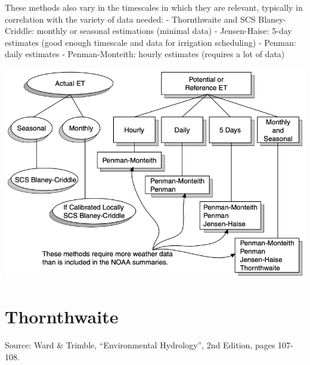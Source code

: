 \documentclass[
  letterpaper,
  DIV=11,
  numbers=noendperiod]{scrreprt}
\begin{document}
These methods also vary in the timescales in which they are relevant,
typically in correlation with the variety of data needed: - Thornthwaite
and SCS Blaney-Criddle: monthly or seasonal estimations (minimal data) -
Jensen-Haise: 5-day estimates (good enough timescale and data for
irrigation scheduling) - Penman: daily estimates - Penman-Monteith:
hourly estimates (requires a lot of data)

\includegraphics{archive/figures/trimble-figure4.13.png}

\hypertarget{thornthwaite}{%
\section{Thornthwaite}\label{thornthwaite}}

Source: Ward \& Trimble, ``Environmental Hydrology'', 2nd Edition, pages
107-108.
\end{document}
